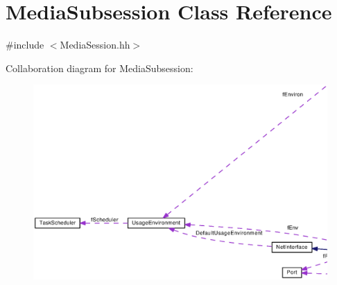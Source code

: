\section{Media\+Subsession Class Reference}
\label{classMediaSubsession}


{\ttfamily \#include $<$Media\+Session.\+hh$>$}



Collaboration diagram for Media\+Subsession\+:
\nopagebreak
\begin{figure}[H]
\begin{center}
\leavevmode
\includegraphics[width=350pt]{classMediaSubsession__coll__graph}
\end{center}
\end{figure}
